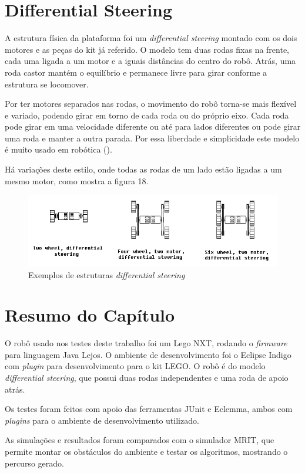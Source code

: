 \section{Differential Steering}

A estrutura física da plataforma foi um \textit{differential steering} montado com os dois motores e as peças do kit já referido. O modelo tem duas rodas fixas na frente, cada uma ligada a um motor e a iguais distâncias do centro do robô. Atrás, uma roda castor mantém o equilíbrio e permanece livre para girar conforme a estrutura se locomover.

Por ter motores separados nas rodas, o movimento do robô torna-se mais flexível e variado, podendo girar em torno de cada roda ou do próprio eixo. Cada roda pode girar em uma velocidade diferente ou até para lados diferentes ou pode girar uma roda e manter a outra parada. Por essa liberdade e simplicidade este modelo é muito usado em robótica (\cite{Mataric2007}).

Há variações deste estilo, onde todas as rodas de um lado estão ligadas a um mesmo motor, como mostra a figura 18.

\begin{figure}[h]
	\centering
	\label{fig18}
		\includegraphics[keepaspectratio=true,scale=0.9]{figuras/3differentialSteering.png}
	\caption{Exemplos de estruturas \textit{differential steering} \cite{IMG_DIFFERENTIAL_STEERING_SITE}}
\end{figure}

\section{Resumo do Capítulo}

O robô usado nos testes deste trabalho foi um Lego NXT, rodando o \textit{firmware} para linguagem Java Lejos. O ambiente de desenvolvimento foi o Eclipse Indigo com \textit{plugin} para desenvolvimento para o kit LEGO. O robô é do modelo \textit{differential steering}, que possui duas rodas independentes e uma roda de apoio atrás.

Os testes foram feitos com apoio das ferramentas JUnit e Eclemma, ambos com \textit{plugins} para o ambiente de desenvolvimento utilizado.

As simulações e resultados foram comparados com o simulador MRIT, que permite montar os obstáculos do ambiente e testar os algoritmos, mostrando o percurso gerado.